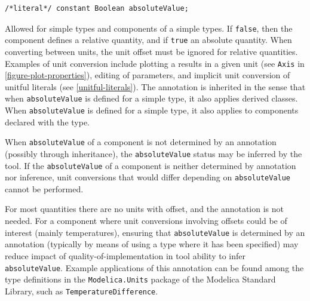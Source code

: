 \begin{annotationdefinition}[absoluteValue]
\begin{synopsis}\begin{lstlisting}
/*literal*/ constant Boolean absoluteValue;
\end{lstlisting}\end{synopsis}
\begin{semantics}
Allowed for simple types and components of a simple types.
If \lstinline!false!, then the component defines a relative quantity, and if \lstinline!true! an absolute quantity.
When converting between units, the unit offset must be ignored for relative quantities.
Examples of unit conversion include plotting a results in a given unit (see \lstinline!Axis! in \cref{figure-plot-properties}), editing of parameters, and implicit unit conversion of unitful literals (see \cref{unitful-literals}).
The annotation is inherited in the sense that when \lstinline!absoluteValue! is defined for a simple type, it also applies derived classes.
When \lstinline!absoluteValue! is defined for a simple type, it also applies to components declared with the type.

When \lstinline!absoluteValue! of a component is not determined by an annotation (possibly through inheritance), the \lstinline!absoluteValue! status may be inferred by the tool.
If the \lstinline!absoluteValue! of a component is neither determined by annotation nor inference, unit conversions that would differ depending on \lstinline!absoluteValue! cannot be performed.

\begin{nonnormative}
For most quantities there are no units with offset, and the annotation is not needed.
For a component where unit conversions involving offsets could be of interest (mainly temperatures), ensuring that \lstinline!absoluteValue! is determined by an annotation (typically by means of using a type where it has been specified) may reduce impact of quality-of-implementation in tool ability to infer \lstinline!absoluteValue!.
Example applications of this annotation can be found among the type definitions in the \lstinline!Modelica.Units! package of the Modelica Standard Library, such as \lstinline!TemperatureDifference!.
\end{nonnormative}
\end{semantics}
\end{annotationdefinition}

